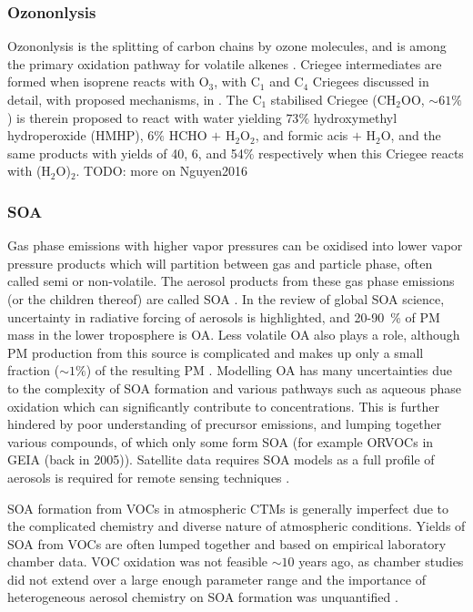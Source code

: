       \subsubsection{Ozononlysis}
      Ozononlysis is the splitting of carbon chains by ozone molecules, and is among the primary oxidation pathway for volatile alkenes \citep{Nguyen2016}.
      Criegee intermediates are formed when isoprene reacts with O$_3$, with C$_1$ and C$_4$ Criegees discussed in detail, with proposed mechanisms, in \cite{Nguyen2016}.
      The C$_1$ stabilised Criegee (CH$_2$OO, $\sim 61\%$) is therein proposed to react with water yielding $73\%$ hydroxymethyl hydroperoxide (HMHP), $6\%$ HCHO $+$ H$_2$O$_2$, and formic acis $+$ H$_2$O, and the same products with yields of 40, 6, and 54$\%$ respectively when this Criegee reacts with (H$_2$O)$_2$.
      TODO: more on Nguyen2016

    
    \subsubsection{SOA}
      \label{LR:sec:SOA}
      Gas phase emissions with higher vapor pressures can be oxidised into lower vapor pressure products which will partition between gas and particle phase, often called semi or non-volatile. 
 	    The aerosol products from these gas phase emissions (or the children thereof) are called SOA \citep{Kanakidou2005}.
      In the \cite{Kanakidou2005} review of global SOA science, uncertainty in radiative forcing of aerosols is highlighted, and 20-90~\% of PM mass in the lower troposphere is OA.
      Less volatile OA also plays a role, although PM production from this source is complicated and makes up only a small fraction ($\sim 1 \%$) of the resulting PM \citep{Kroll2008,Bei2012}.
      Modelling OA has many uncertainties due to the complexity of SOA formation and various pathways such as aqueous phase oxidation which can significantly contribute to concentrations.
      This is further hindered by poor understanding of precursor emissions, and lumping together various compounds, of which only some form SOA (for example ORVOCs in GEIA (back in 2005)).
      Satellite data requires SOA models as a full profile of aerosols is required for remote sensing techniques \citep{Kanakidou2005}.
      
      SOA formation from VOCs in atmospheric CTMs is generally imperfect due to the complicated chemistry and diverse nature of atmospheric conditions.
      Yields of SOA from VOCs are often lumped together and based on empirical laboratory chamber data. 
      VOC oxidation was not feasible $\sim 10$ years ago,  as chamber studies did not extend over a large enough parameter range and the importance of heterogeneous aerosol chemistry on SOA formation was unquantified \citep{Kanakidou2005}.
      
